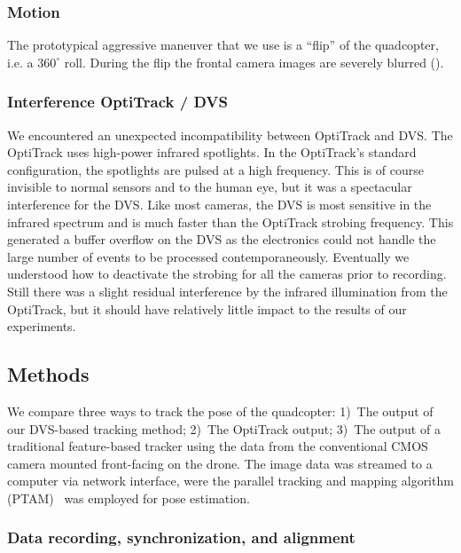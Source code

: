 \subsubsection{Motion}

The prototypical aggressive maneuver that we use is a ``flip'' of
the quadcopter, i.e. a $360^{\circ}$ roll. During the flip the frontal
camera images are severely blurred (). 




\subsubsection{Interference OptiTrack / DVS}

We encountered an unexpected incompatibility between OptiTrack and
DVS. The OptiTrack uses high-power infrared spotlights. In the OptiTrack's
standard configuration, the spotlights are pulsed at a high frequency.
This is of course invisible to normal sensors and to the human eye,
but it was a spectacular interference for the DVS. Like most cameras,
the DVS is most sensitive in the infrared spectrum and is much faster
than the OptiTrack strobing frequency. This generated a buffer overflow
on the DVS as the electronics could not handle the large number of
events to be processed contemporaneously. Eventually we understood
how to deactivate the strobing for all the cameras prior to recording.
Still there was a slight residual interference by the infrared illumination
from the OptiTrack, but it should have relatively little impact to
the results of our experiments.


\subsection{Methods}

We compare three ways to track the pose of the quadcopter: 1)~The
output of our DVS-based \ALM tracking method; 2)~The OptiTrack output;
3)~The output of a traditional feature-based tracker using the data
from the conventional CMOS camera mounted front-facing on the drone.
The image data was streamed to a computer via network interface, were
the parallel tracking and mapping algorithm (PTAM)~\cite{PTAM} was
employed for pose estimation.


\subsubsection{Data recording, synchronization, and alignment\label{sec:datarecording}}

